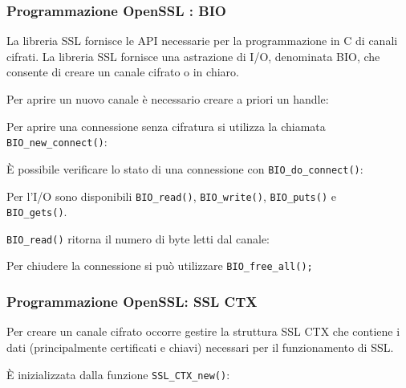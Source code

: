             

        \subsubsection{Programmazione OpenSSL : BIO}
            La libreria SSL fornisce le API necessarie per la programmazione in C di canali cifrati. La libreria SSL fornisce una astrazione di I/O, denominata BIO, che consente di creare un canale cifrato o in chiaro.

            Per aprire un nuovo canale è necessario creare a priori un handle:

            

            Per aprire una connessione senza cifratura si utilizza la chiamata \\\verb|BIO_new_connect()|:

            

            È possibile verificare lo stato di una connessione con \verb|BIO_do_connect()|:

            

            Per l'I/O sono disponibili \verb|BIO_read()|, \verb|BIO_write()|, \verb|BIO_puts()| e \\\verb|BIO_gets()|.

            

            \verb|BIO_read()| ritorna il numero di byte letti dal canale:

            

            Per chiudere la connessione si può utilizzare \verb|BIO_free_all();|

        \subsubsection{Programmazione OpenSSL: SSL CTX}
            Per creare un canale cifrato occorre gestire la struttura SSL CTX che contiene i dati (principalmente certificati e chiavi) necessari per il funzionamento di SSL.
        
            È inizializzata dalla funzione \verb|SSL_CTX_new()|:

            

